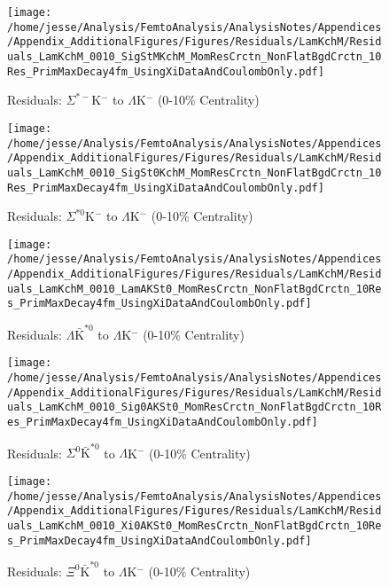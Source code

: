 \documentclass[/home/jesse/Analysis/FemtoAnalysis/AnalysisNotes/AnalysisNoteJBuxton.tex]{subfiles}
\begin{document}
\begin{figure}[h]
  \centering
  \texttt{[image: /home/jesse/Analysis/FemtoAnalysis/AnalysisNotes/Appendices/Appendix\_AdditionalFigures/Figures/Residuals/LamKchM/Residuals\_LamKchM\_0010\_SigStMKchM\_MomResCrctn\_NonFlatBgdCrctn\_10Res\_PrimMaxDecay4fm\_UsingXiDataAndCoulombOnly.pdf]}
  \caption[Residuals: $\Sigma^{*-}$K$^{-}$ to $\Lambda$K$^{-}$ (0-10\% Centrality)]{Residuals: $\Sigma^{*-}$K$^{-}$ to $\Lambda$K$^{-}$ (0-10\% Centrality)}
  \label{fig:Res_LamKchM_0010_SigStMKchM}
\end{figure}

\begin{figure}[h]
  \centering
  \texttt{[image: /home/jesse/Analysis/FemtoAnalysis/AnalysisNotes/Appendices/Appendix\_AdditionalFigures/Figures/Residuals/LamKchM/Residuals\_LamKchM\_0010\_SigSt0KchM\_MomResCrctn\_NonFlatBgdCrctn\_10Res\_PrimMaxDecay4fm\_UsingXiDataAndCoulombOnly.pdf]}
  \caption[Residuals: $\Sigma^{*0}$K$^{-}$ to $\Lambda$K$^{-}$ (0-10\% Centrality)]{Residuals: $\Sigma^{*0}$K$^{-}$ to $\Lambda$K$^{-}$ (0-10\% Centrality)}
  \label{fig:Res_LamKchM_0010_SigSt0KchM}
\end{figure}


\begin{figure}[h]
  \centering
  \texttt{[image: /home/jesse/Analysis/FemtoAnalysis/AnalysisNotes/Appendices/Appendix\_AdditionalFigures/Figures/Residuals/LamKchM/Residuals\_LamKchM\_0010\_LamAKSt0\_MomResCrctn\_NonFlatBgdCrctn\_10Res\_PrimMaxDecay4fm\_UsingXiDataAndCoulombOnly.pdf]}
  \caption[Residuals: $\Lambda\bar{\mathrm{K}}^{*0}$ to $\Lambda$K$^{-}$ (0-10\% Centrality)]{Residuals: $\Lambda\bar{\mathrm{K}}^{*0}$ to $\Lambda$K$^{-}$ (0-10\% Centrality)}
  \label{fig:Res_LamKchM_0010_LamAKSt0}
\end{figure}


\begin{figure}[h]
  \centering
  \texttt{[image: /home/jesse/Analysis/FemtoAnalysis/AnalysisNotes/Appendices/Appendix\_AdditionalFigures/Figures/Residuals/LamKchM/Residuals\_LamKchM\_0010\_Sig0AKSt0\_MomResCrctn\_NonFlatBgdCrctn\_10Res\_PrimMaxDecay4fm\_UsingXiDataAndCoulombOnly.pdf]}
  \caption[Residuals: $\Sigma^{0}\bar{\mathrm{K}}^{*0}$ to $\Lambda$K$^{-}$ (0-10\% Centrality)]{Residuals: $\Sigma^{0}\bar{\mathrm{K}}^{*0}$ to $\Lambda$K$^{-}$ (0-10\% Centrality)}
  \label{fig:Res_LamKchM_0010_Sig0AKSt0}
\end{figure}


\begin{figure}[h]
  \centering
  \texttt{[image: /home/jesse/Analysis/FemtoAnalysis/AnalysisNotes/Appendices/Appendix\_AdditionalFigures/Figures/Residuals/LamKchM/Residuals\_LamKchM\_0010\_Xi0AKSt0\_MomResCrctn\_NonFlatBgdCrctn\_10Res\_PrimMaxDecay4fm\_UsingXiDataAndCoulombOnly.pdf]}
  \caption[Residuals: $\Xi^{0}\bar{\mathrm{K}}^{*0}$ to $\Lambda$K$^{-}$ (0-10\% Centrality)]{Residuals: $\Xi^{0}\bar{\mathrm{K}}^{*0}$ to $\Lambda$K$^{-}$ (0-10\% Centrality)}
  \label{fig:Res_LamKchM_0010_Xi0AKSt0}
\end{figure}
\end{document}
